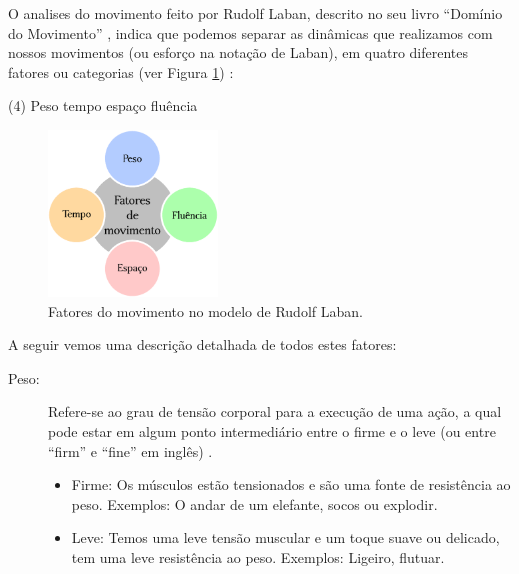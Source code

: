 O  analises do movimento feito por Rudolf Laban, 
descrito no seu livro ``Domínio do Movimento'' \cite[pp. 28]{laban1987dominio},
indica que podemos separar as dinâmicas que realizamos com nossos movimentos
(ou esforço na notação de Laban), 
em quatro diferentes fatores ou categorias (ver Figura \ref{fig:fatores:moviemnto:Laban})
\cite[pp. 142]{laban1987dominio} 
\cite[pp. 93]{maletic2011body}
\cite[pp. 30]{paine2014complete}
\cite[pp. 5]{carline2011lesson}: 
\begin{tasks}(4)
\task Peso
\task tempo 
\task espaço 
\task fluência
\end{tasks}

\begin{figure}
\centering

\vspace{-5pt}
\includegraphics[width=0.4\textwidth]{chapters/cap-musicalidade/elementos-musica-1.eps}
\vspace{-5pt}
\caption{Fatores do movimento no modelo de Rudolf Laban.}
\vspace{-10pt}
\label{fig:fatores:moviemnto:Laban}
\end{figure}
A seguir vemos uma descrição detalhada de todos estes fatores:\\
\begin{description}
\item[Peso:]
Refere-se ao grau de tensão corporal para a execução de uma ação, 
a qual pode estar em algum ponto intermediário entre o firme e o leve 
(ou entre ``firm'' e ``fine'' em inglês) 
\cite[pp. 137, 143]{laban1987dominio}  \cite[pp. 5]{carline2011lesson} \cite[pp. 28]{elementosdanca2017}. 
\begin{itemize}
\item Firme: Os músculos estão tensionados e são uma fonte de resistência ao peso. Exemplos: O andar de um elefante, socos ou explodir.
\item Leve: Temos uma leve tensão muscular e um toque suave ou delicado,
tem uma leve resistência ao peso.  Exemplos: Ligeiro, flutuar.
\end{itemize}~
\end{description}


